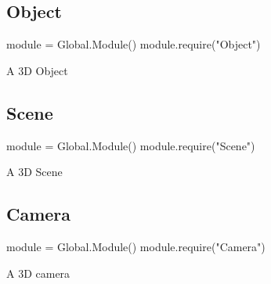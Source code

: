 \subsection*{Object}


\begin{DoxyCode}
module = Global.Module()
module.require("Object")
\end{DoxyCode}
 A 3D Object





\subsection*{Scene}


\begin{DoxyCode}
module = Global.Module()
module.require("Scene")
\end{DoxyCode}
 A 3D Scene





\subsection*{Camera}


\begin{DoxyCode}
module = Global.Module()
module.require("Camera")
\end{DoxyCode}
 A 3D camera 